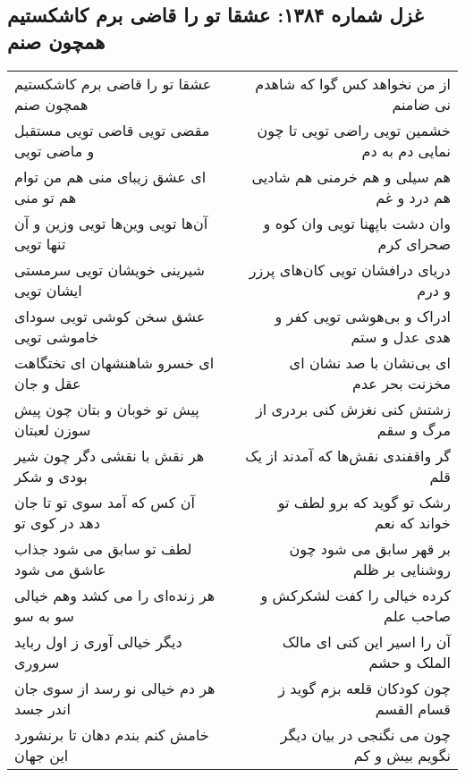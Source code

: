 \begin{center}
\section*{غزل شماره ۱۳۸۴: عشقا تو را قاضی برم کاشکستیم همچون صنم}
\label{sec:1384}
\begin{longtable}{l p{0.5cm} r}
عشقا تو را قاضی برم کاشکستیم همچون صنم
&&
از من نخواهد کس گوا که شاهدم نی ضامنم
\\
مقضی تویی قاضی تویی مستقبل و ماضی تویی
&&
خشمین تویی راضی تویی تا چون نمایی دم به دم
\\
ای عشق زیبای منی هم من توام هم تو منی
&&
هم سیلی و هم خرمنی هم شادیی هم درد و غم
\\
آن‌ها تویی وین‌ها تویی وزین و آن تنها تویی
&&
وان دشت باپهنا تویی وان کوه و صحرای کرم
\\
شیرینی خویشان تویی سرمستی ایشان تویی
&&
دریای درافشان تویی کان‌های پرزر و درم
\\
عشق سخن کوشی تویی سودای خاموشی تویی
&&
ادراک و بی‌هوشی تویی کفر و هدی عدل و ستم
\\
ای خسرو شاهنشهان ای تختگاهت عقل و جان
&&
ای بی‌نشان با صد نشان ای مخزنت بحر عدم
\\
پیش تو خوبان و بتان چون پیش سوزن لعبتان
&&
زشتش کنی نغزش کنی بردری از مرگ و سقم
\\
هر نقش با نقشی دگر چون شیر بودی و شکر
&&
گر واقفندی نقش‌ها که آمدند از یک قلم
\\
آن کس که آمد سوی تو تا جان دهد در کوی تو
&&
رشک تو گوید که برو لطف تو خواند که نعم
\\
لطف تو سابق می شود جذاب عاشق می شود
&&
بر قهر سابق می شود چون روشنایی بر ظلم
\\
هر زنده‌ای را می کشد وهم خیالی سو به سو
&&
کرده خیالی را کفت لشکرکش و صاحب علم
\\
دیگر خیالی آوری ز اول رباید سروری
&&
آن را اسیر این کنی ای مالک الملک و حشم
\\
هر دم خیالی نو رسد از سوی جان اندر جسد
&&
چون کودکان قلعه بزم گوید ز قسام القسم
\\
خامش کنم بندم دهان تا برنشورد این جهان
&&
چون می نگنجی در بیان دیگر نگویم بیش و کم
\\
\end{longtable}
\end{center}
